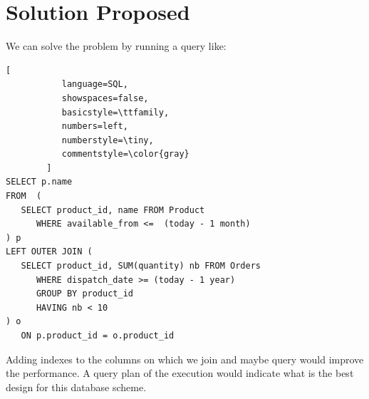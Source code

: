 \documentclass[12pt,a4paper,article]{memoir} %
\begin{document}
\section{Solution Proposed}
We can solve the problem by running a query like:
\begin{lstlisting}[
           language=SQL,
           showspaces=false,
           basicstyle=\ttfamily,
           numbers=left,
           numberstyle=\tiny,
           commentstyle=\color{gray}
        ]
SELECT p.name
FROM  (
   SELECT product_id, name FROM Product 
      WHERE available_from <=  (today - 1 month)
) p
LEFT OUTER JOIN (
   SELECT product_id, SUM(quantity) nb FROM Orders
      WHERE dispatch_date >= (today - 1 year)
      GROUP BY product_id
      HAVING nb < 10
) o
   ON p.product_id = o.product_id
\end{lstlisting}

Adding indexes to the columns on which we join and maybe query would improve 
the performance. 
A query plan of the execution would indicate what is the best design for this 
database scheme.
\end{document}
